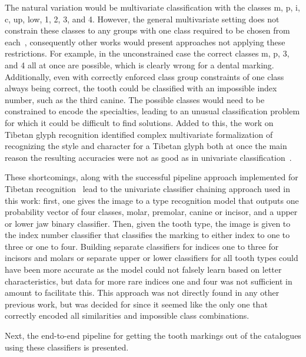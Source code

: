 \documentclass[english,twoside,openright]{UH_DS_MSc}
\begin{document}
The natural variation would be multivariate classification with the classes m, p, i, c, up, low, 1, 2, 3, and 4. However, 
the general multivariate setting does not constrain these classes to any groups with one class required to be chosen from 
each~\cite{multilabel_classification}, consequently other works would present approaches not applying these restrictions.
For example, in the unconstrained case the correct classes m, p, 3, and 4 all at 
once are possible, which is clearly wrong for a dental marking. Additionally, even with correctly enforced class group constraints of one class always being correct, the tooth could be classified with an impossible index number, such as the third canine.
The possible classes would need to be constrained to encode the specialties, leading to an unusual classification problem for which it could be difficult to 
find solutions. Added to this, the work on Tibetan glyph recognition identified complex multivariate formalization of 
recognizing the style and character for a Tibetan glyph both at once the main reason the resulting 
accuracies were not as good as in univariate classification~\cite{4zhaoTibetan}.

These shortcomings, along with the successful pipeline approach implemented for Tibetan recognition~\cite{4zhaoTibetan}
lead to the univariate classifier chaining approach used in this work: first, one gives the image to a type recognition 
model that outputs one probability vector of four classes, molar, premolar, canine or incisor, and a upper or lower jaw 
binary classifier. Then, given the tooth type, the image is given to the index number classifier that classifies the marking 
to either index to one to three or one to four. Building separate classifiers for indices one to three for incisors and molars
or separate upper or lower classifiers for all tooth types 
could have been more accurate as the model could not falsely learn based on letter characteristics, but data for more rare indices 
one and four was not sufficient in amount to facilitate this.
This approach was not directly found in any other previous work, but was decided 
for since it seemed like the only one that correctly encoded all similarities and impossible class combinations. 

Next, the end-to-end pipeline for getting the tooth markings out of the catalogues using these classifiers is presented.
\end{document}
